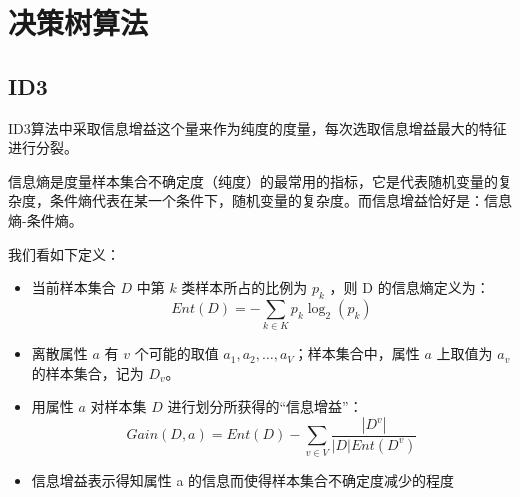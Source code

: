 \documentclass{ML}
\begin{document}
\section{决策树算法}

\subsection{ID3}

ID3算法中采取信息增益这个量来作为纯度的度量，每次选取信息增益最大的特征进行分裂。

信息熵是度量样本集合不确定度（纯度）的最常用的指标，它是代表随机变量的复杂度，条件熵代表在某一个条件下，随机变量的复杂度。而信息增益恰好是：信息熵-条件熵。

我们看如下定义：

\begin{itemize}
	\item 当前样本集合 $D$ 中第 $k$ 类样本所占的比例为 $p_k$ ，则 D 的信息熵定义为：$$ Ent(D) = - \sum_{k \in K} p_k \log_2(p_k) $$
	\item 离散属性 $a$ 有 $v$ 个可能的取值 ${a_1,a_2,\dots,a_V}$；样本集合中，属性 $a$ 上取值为 $a_v$ 的样本集合，记为 $D_v$。
	\item 用属性 $a$ 对样本集 $D$ 进行划分所获得的“信息增益”：$$Gain(D,a) = Ent(D) - \sum_{v \in V} \frac{ |D^v| }{ |D| Ent(D^v) }$$
	\item 信息增益表示得知属性 a 的信息而使得样本集合不确定度减少的程度
\end{itemize}
\end{document}
